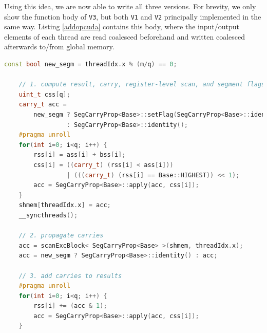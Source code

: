 Using this idea, we are now able to write all three versions. For brevity, we
only show the function body of \texttt{V3}, but both \texttt{V1} and \texttt{V2}
principally implemented in the same way. Listing \ref{addopcuda} contains this
body, where the input/output elements of each thread are read coalesced
beforehand and written coalesced afterwards to/from global memory.
% 
\begin{lstlisting}[language=CPP,caption={\footnotesize
  CUDA \textit{badd} \texttt{V3} implementation body from file
  \texttt{ker-add.cu.h} (slightly edited), where registers \texttt{ass}, \texttt{bss}, and
  \texttt{rss} contains $q$ input/output digits, respectively, of type
  \texttt{uint\_t} with base class \texttt{Base}, segmented scan operator class
  \texttt{SegCarryProp} over carry type \texttt{carry\_t}, and shared memory
  buffer
  \texttt{shmem}.},label={addopcuda},firstnumber=212,gobble=4]
    const bool new_segm = threadIdx.x % (m/q) == 0;

    // 1. compute result, carry, register-level scan, and segment flags
    uint_t css[q];
    carry_t acc =
        new_segm ? SegCarryProp<Base>::setFlag(SegCarryProp<Base>::identity())
                 : SegCarryProp<Base>::identity();
    #pragma unroll
    for(int i=0; i<q; i++) {
        rss[i] = ass[i] + bss[i];
        css[i] = ((carry_t) (rss[i] < ass[i]))
                 | (((carry_t) (rss[i] == Base::HIGHEST)) << 1);
        acc = SegCarryProp<Base>::apply(acc, css[i]);
    }
    shmem[threadIdx.x] = acc;
    __syncthreads();

    // 2. propagate carries
    acc = scanExcBlock< SegCarryProp<Base> >(shmem, threadIdx.x);
    acc = new_segm ? SegCarryProp<Base>::identity() : acc;

    // 3. add carries to results
    #pragma unroll
    for(int i=0; i<q; i++) {
        rss[i] += (acc & 1);
        acc = SegCarryProp<Base>::apply(acc, css[i]);
    }
\end{lstlisting}

